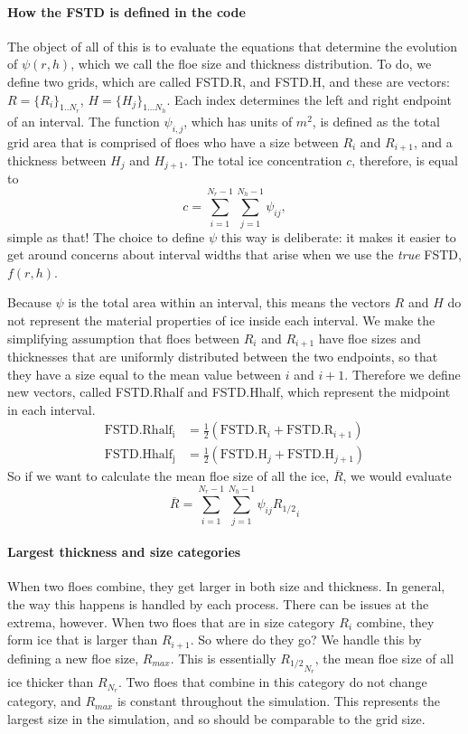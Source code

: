 \documentclass{article}
\begin{document}
\newpage

\paragraph{How the FSTD is defined in the code}
The object of all of this is to evaluate the equations that determine the evolution of $\psi(r,h)$, which we call the floe size and thickness distribution. To do, we define two grids, which are called FSTD.R, and FSTD.H, and these are vectors: $R = \{R_i\}_{1..N_r}$, $H = \{H_j\}_{1...N_h}$. Each index determines the left and right endpoint of an interval. The function $\psi_{i,j}$, which has units of $m^2$, is defined as the total grid area that is comprised of floes who have a size between $R_i$ and $R_{i+1}$, and a thickness between $H_j$ and $H_{j+1}$. The total ice concentration $c$, therefore, is equal to 
$$ c = \sum\limits_{i=1}^{N_r-1}\sum\limits_{j=1}^{N_h-1} \psi_{ij},$$
simple as that! The choice to define $\psi$ this way is deliberate: it makes it easier to get around concerns about interval widths that arise when we use the \textit{true} FSTD, $f(r,h)$. 

Because $\psi$ is the total area within an interval, this means the vectors $R$ and $H$ do not represent the material properties of ice inside each interval. We make the simplifying assumption that floes between $R_i$ and $R_{i+1}$ have floe sizes and thicknesses that are uniformly distributed between the two endpoints, so that they have a size equal to the mean value between $i$ and $i+1$. Therefore we define new vectors, called FSTD.Rhalf and FSTD.Hhalf, which represent the midpoint in each interval. 
\begin{align*}
\mathrm{FSTD.Rhalf_i} &= \frac12\left(\mathrm{FSTD.R}_i + \mathrm{FSTD.R}_{i+1}\right) \\
\mathrm{FSTD.Hhalf_j} &= \frac12\left(\mathrm{FSTD.H}_j + \mathrm{FSTD.H}_{j+1}\right)
\end{align*}
So if we want to calculate the mean floe size of all the ice, $\overline{R}$, we would evaluate
\begin{equation}
\overline{R} =  \sum\limits_{i=1}^{N_r-1}\sum\limits_{j=1}^{N_h-1} \psi_{ij}\left.R_{1/2}\right._i 
\end{equation}

\paragraph{Largest thickness and size categories}
When two floes combine, they get larger in both size and thickness. In general, the way this happens is handled by each process. There can be issues at the extrema, however. When two floes that are in size category $R_i$ combine, they form ice that is larger than $R_{i+1}$. So where do they go? We handle this by defining a new floe size, $R_{max}$. This is essentially $\left.R_{1/2}\right._{N_r}$, the mean floe size of all ice thicker than $R_{N_r}$. Two floes that combine in this category do not change category, and $R_{max}$ is constant throughout the simulation. This represents the largest size in the simulation, and so should be comparable to the grid size. 
\end{document}
